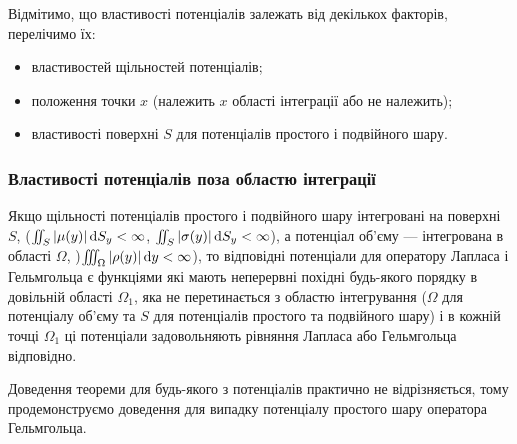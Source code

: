 Відмітимо, що властивості потенціалів залежать від декількох факторів, перелічимо їх:
\begin{itemize}
	\item властивостей щільностей потенціалів;
	\item положення точки $x$ (належить $x$ області інтеграції або не належить);
	\item властивості поверхні $S$ для потенціалів простого і подвійного шару.
\end{itemize}

\subsubsection{Властивості потенціалів поза областю інтеграції}

\begin{theorem}
	\label{th:4.8.1}
	Якщо щільності потенціалів простого і подвійного шару інтегровані на поверхні $S$, ($\iint_S |\mu(y)| \mathop{}\!\mathrm{d} S_y < \infty$, $\iint_S |\sigma(y)| \mathop{}\!\mathrm{d} S_y < \infty$), а потенціал об'єму --- інтегрована в області $\Omega$, )$\iiint_\Omega |\rho(y)| \mathop{}\!\mathrm{d} y < \infty$), то відповідні потенціали для оператору Лапласа і Гельмгольца є функціями які мають неперервні похідні будь-якого порядку в довільній області $\Omega_1$, яка не перетинається з областю інтегрування ($\Omega$ для потенціалу об'єму та $S$ для потенціалів простого та подвійного шару) і в кожній точці $\Omega_1$ ці потенціали задовольняють рівняння Лапласа або Гельмгольца відповідно.
\end{theorem}

Доведення теореми для будь-якого з потенціалів практично не відрізняється, тому продемонструємо доведення для випадку потенціалу простого шару оператора Гельмгольца. 

